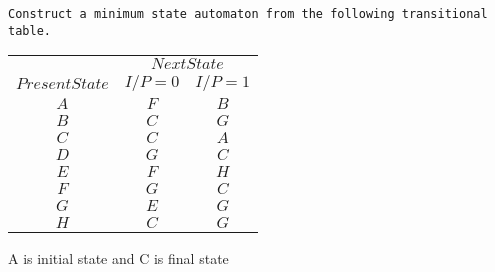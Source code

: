 \documentclass[a4,9pt]{beamer}
\begin{document}
\begin{frame}
\hspace*{0.1cm} \texttt{Construct a minimum state automaton from the following transitional table.}

\pause
\begin{center}
\begin{tabular}{ccc}
 \hline

 \hline

 \hline

 \hline
 & \multicolumn{2}{c}{$Next State$}\\
 \cline{2-3}
 $Present State$ &  $I/P=0$ & $I/P=1$\\
\hline
 $A$    &    $F$    &   $B$  \\
 $B$    &    $C$    &   $G$  \\
 $C$    &    $C$    &   $A$  \\
 $D$    &    $G$    &   $C$  \\
 $E$    &    $F$    &   $H$  \\
 $F$    &    $G$    &   $C$  \\
 $G$    &    $E$    &   $G$  \\
 $H$    &    $C$    &   $G$  \\
 \hline

 \hline

 \hline

 \hline
\end{tabular}
\end{center}
A is initial state and C is final state
\end{frame}
\end{document}

